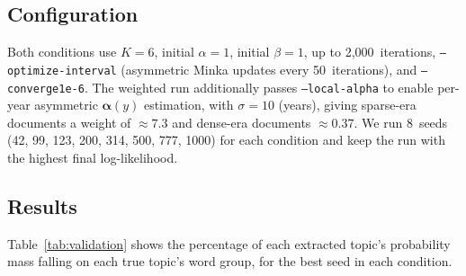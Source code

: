 \documentclass[11pt]{article}
\begin{document}
\subsection{Configuration}

Both conditions use $K=6$, initial $\alpha=1$, initial $\beta=1$, up to 2{,}000~iterations, \texttt{--optimize-interval} (asymmetric Minka updates every 50~iterations), and \texttt{--converge\;1e-6}.
The weighted run additionally passes \texttt{--local-alpha} to enable per-year asymmetric $\boldsymbol\alpha(y)$ estimation, with $\sigma=10$ (years), giving sparse-era documents a weight of ${\approx}7.3$ and dense-era documents ${\approx}0.37$.
We run 8~seeds (42, 99, 123, 200, 314, 500, 777, 1000) for each condition and keep the run with the highest final log-likelihood.

\subsection{Results}

Table~\ref{tab:validation} shows the percentage of each extracted topic's probability mass falling on each true topic's word group, for the best seed in each condition.
\end{document}
